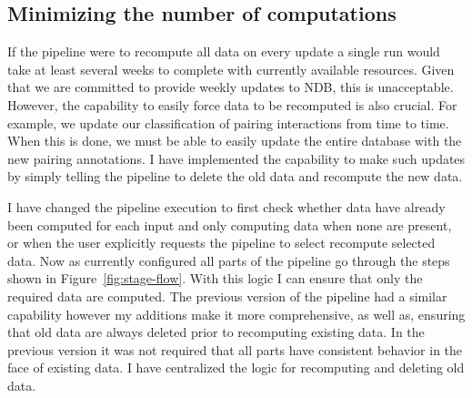 \subsection{Minimizing the number of computations}

If the pipeline were to recompute all data on every update a single run would
take at least several weeks to complete with currently available resources.
Given that we are committed to provide weekly updates to NDB, this is
unacceptable. However, the capability to easily force data to be recomputed is
also crucial. For example, we update our classification of pairing interactions
from time to time. When this is done, we must be able to easily update the
entire database with the new pairing annotations. I have implemented the
capability to make such updates by simply telling the pipeline to delete the old
data and recompute the new data.

I have changed the pipeline execution to first check whether data have already
been computed for each input and only computing data when none are present, or
when the user explicitly requests the pipeline to select recompute selected
data. Now as currently configured all parts of the pipeline go through the steps
shown in Figure~\ref{fig:stage-flow}. With this logic I can ensure that only the
required data are computed. The previous version of the pipeline had a similar
capability however my additions make it more comprehensive, as well as, ensuring
that old data are always deleted prior to recomputing existing data. In the
previous version it was not required that all parts have consistent behavior in
the face of existing data. I have centralized the logic for recomputing and
deleting old data.

